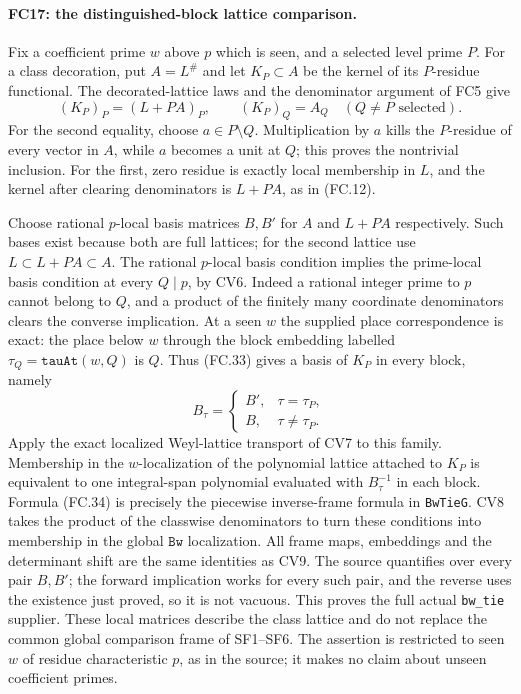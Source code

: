 \paragraph{FC17: the distinguished-block lattice comparison.}
Fix a coefficient prime $w$ above $p$ which is seen, and a selected
level prime $P$. For a class decoration, put $A=L^\#$ and let
$K_P\subset A$ be the kernel of its $P$-residue functional.
The decorated-lattice laws and the denominator argument of FC5 give
\[
 (K_P)_P=(L+PA)_P,\qquad (K_P)_Q=A_Q
             \quad(Q\ne P\text{ selected}).          \tag{FC.33}
\]
For the second equality, choose $a\in P\setminus Q$.
Multiplication by $a$ kills the $P$-residue of every vector in $A$,
while $a$ becomes a unit at $Q$; this proves the nontrivial inclusion.
For the first, zero residue is exactly local membership in $L$,
and the kernel after clearing denominators is $L+PA$, as in (FC.12).

Choose rational $p$-local basis matrices $B,B'$ for $A$ and
$L+PA$ respectively. Such bases exist because both are full lattices;
for the second lattice use $L\subset L+PA\subset A$.
The rational $p$-local basis condition implies the prime-local basis
condition at every $Q\mid p$, by CV6. Indeed a rational integer
prime to $p$ cannot belong to $Q$, and a product of the finitely many
coordinate denominators clears the converse implication.
At a seen $w$ the supplied place correspondence is exact:
the place below $w$ through the block embedding labelled
$\tau_Q=\texttt{tauAt}(w,Q)$ is $Q$.
Thus (FC.33) gives a basis of $K_P$ in every block, namely
\[
 B_\tau=\begin{cases}B',&\tau=\tau_P,\\B,&\tau\ne\tau_P.
            \end{cases}                              \tag{FC.34}
\]
Apply the exact localized Weyl-lattice transport of CV7 to this family.
Membership in the $w$-localization of the polynomial lattice attached
to $K_P$ is equivalent to one integral-span polynomial evaluated with
$B_\tau^{-1}$ in each block. Formula (FC.34) is precisely the
piecewise inverse-frame formula in \texttt{BwTieG}. CV8 takes the
product of the classwise denominators to turn these conditions into
membership in the global $\texttt{Bw}$ localization. All frame maps,
embeddings and the determinant shift are the same identities as CV9.
The source quantifies over every pair $B,B'$; the forward implication
works for every such pair, and the reverse uses the existence just proved,
so it is not vacuous. This proves the full actual \texttt{bw\_tie}
supplier. These local matrices describe the class lattice and do not
replace the common global comparison frame of SF1--SF6. The assertion
is restricted to seen $w$ of residue characteristic $p$, as in the
source; it makes no claim about unseen coefficient primes.

